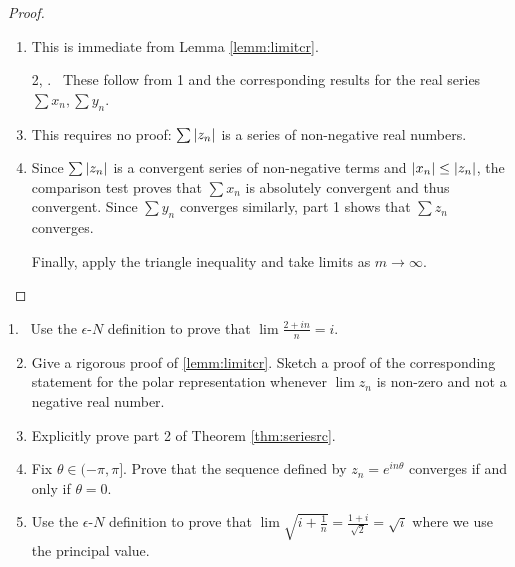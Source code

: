 \begin{proof}
\begin{enumerate}\itemsep0pt
  \item This is immediate from Lemma \ref{lemm:limitcr}.
  \item[2,]. \ These follow from 1 and the corresponding results for the real series $\sum x_n,\sum y_n$.
  \setcounter{enumi}{3}
  \item This requires no proof: $\sum \left| z_n\right|$ is a series of non-negative real numbers.
  \item Since $\sum\left| z_n\right|$ is a convergent series of non-negative terms and $\left| x_n\right|\le\left| z_n\right|$, the comparison test proves that $\sum x_n$ is absolutely convergent and thus convergent.
  Since $\sum y_n$ converges similarly, part 1 shows that $\sum z_n$ converges.\par
  Finally, apply the triangle inequality  and take limits as $m\to\infty$.\qedhere
\end{enumerate}
\end{proof}

\begin{exercises*}
\hangindent\leftmargini
\textup{1.} \ Use the $\epsilon$-$N$ definition to prove that $\lim\frac{2+in}n= i$.
\begin{enumerate}\setcounter{enumi}{1}
  \item Give a rigorous proof of \ref{lemm:limitcr}. Sketch a proof of the corresponding statement for the polar representation whenever $\lim z_n$ is non-zero and not a negative real number.
  
  \item Explicitly prove part 2 of Theorem \ref{thm:seriesrc}.
  
  \item Fix $\theta\in (-\pi,\pi]$. Prove that the sequence defined by $z_n =e^{in\theta}$ converges if and only if $\theta = 0$.
  
  \item Use the $\epsilon$-$N$ definition to prove that $\lim\sqrt{i+\frac 1n}=\frac{1+i}{\sqrt 2}=\sqrt i$ where we use the principal value.%
\end{enumerate}
\end{exercises*}
 
